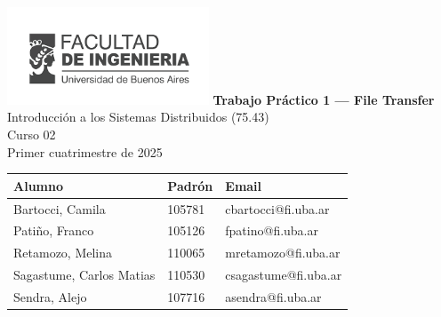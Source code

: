 
\begin{titlepage} %
  \hfill\includegraphics[width=6cm]{images/logofiuba.png}
    \centering
    \vfill
    \Huge \textbf{Trabajo Práctico 1 — File Transfer}
    \vskip2cm
    \Large Introducción a los Sistemas Distribuidos (75.43) \\
    Curso 02 \\ 
    Primer cuatrimestre de 2025
    \vfill
    \begin{tabular}{ | l | l | l | } %
      \hline
      Alumno & Padrón & Email \\ \hline
      Bartocci, Camila & 105781 & cbartocci@fi.uba.ar \\ \hline
      Patiño, Franco & 105126 & fpatino@fi.uba.ar \\ \hline
      Retamozo, Melina & 110065 & mretamozo@fi.uba.ar \\ \hline
      Sagastume, Carlos Matias & 110530 & csagastume@fi.uba.ar \\ \hline
      Sendra, Alejo & 107716 & asendra@fi.uba.ar \\ \hline
    \end{tabular}
    \vfill
    \vfill
\end{titlepage}